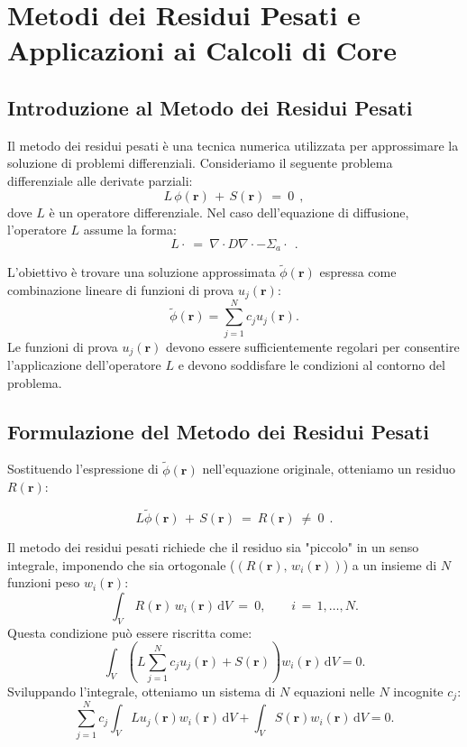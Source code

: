 
\chapter{Metodi dei Residui Pesati e Applicazioni ai Calcoli di Core}
	
\section{Introduzione al Metodo dei Residui Pesati}
	Il metodo dei residui pesati è una tecnica numerica utilizzata per approssimare la soluzione di problemi differenziali. Consideriamo il seguente problema differenziale alle derivate parziali:
	\[
	L \,\phi(\mathbf{r})\, +\, S(\mathbf{r})\ =\ 0\ \ ,
	\]
	dove \(L\) è un operatore differenziale. Nel caso dell'equazione di diffusione, l'operatore \(L\) assume la forma:
	\[
	L \cdot\ =\ \nabla \cdot D \nabla \cdot - \Sigma_a \cdot\ \ .
	\]
	
	L'obiettivo è trovare una soluzione approssimata \(\tilde{\phi}(\mathbf{r})\) espressa come combinazione lineare di funzioni di prova \(u_j(\mathbf{r})\):
	\[
	\tilde{\phi}(\mathbf{r}) = \sum_{j=1}^N c_j u_j(\mathbf{r}).
	\]
	Le funzioni di prova \(u_j(\mathbf{r})\) devono essere sufficientemente regolari per consentire l'applicazione dell'operatore \(L\) e devono soddisfare le condizioni al contorno del problema.
	
\section{Formulazione del Metodo dei Residui Pesati}
	Sostituendo l'espressione di \(\tilde{\phi}(\mathbf{r})\) nell'equazione originale, otteniamo un residuo \(R(\mathbf{r})\):
	
	\[
	L \tilde{\phi}(\mathbf{r})\, +\, S(\mathbf{r})\ =\ R(\mathbf{r})\ \neq\ 0\ \ .
	\]
	
	Il metodo dei residui pesati richiede che il residuo sia "piccolo" in un senso integrale, imponendo che sia ortogonale ($\left(R(\mathbf r),\, w_i(\mathbf r)\right)$) a un insieme di \(N\) funzioni peso \(w_i(\mathbf{r})\):
	\[
	\int_V\, R(\mathbf{r})\, w_i(\mathbf{r}) \, \mathrm{d}V\ =\ 0, \qquad i\, =\, 1, \dots, N.
	\]
	Questa condizione può essere riscritta come:
	\[
	\int_V \left( L \sum_{j=1}^N c_j u_j(\mathbf{r}) + S(\mathbf{r}) \right) w_i(\mathbf{r}) \, \mathrm{d}V = 0.
	\]
	Sviluppando l'integrale, otteniamo un sistema di \(N\) equazioni nelle \(N\) incognite \(c_j\):
	\[
	\sum_{j=1}^N c_j \int_V L u_j(\mathbf{r}) w_i(\mathbf{r}) \, \mathrm{d}V + \int_V S(\mathbf{r}) w_i(\mathbf{r}) \, \mathrm{d}V = 0.
	\]
	
